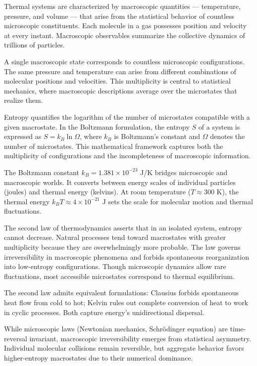 Thermal systems are characterized by macroscopic quantities — temperature, pressure, and volume — that arise from the statistical behavior of countless microscopic constituents. Each molecule in a gas possesses position and velocity at every instant. Macroscopic observables summarize the collective dynamics of trillions of particles.

A single macroscopic state corresponds to countless microscopic configurations. The same pressure and temperature can arise from different combinations of molecular positions and velocities. This multiplicity is central to statistical mechanics, where macroscopic descriptions average over the microstates that realize them.

Entropy quantifies the logarithm of the number of microstates compatible with a given macrostate. In the Boltzmann formulation, the entropy $S$ of a system is expressed as $S = k_B \ln \Omega$, where $k_B$ is Boltzmann's constant and $\Omega$ denotes the number of microstates. This mathematical framework captures both the multiplicity of configurations and the incompleteness of macroscopic information.

The Boltzmann constant $k_B = 1.381 \times 10^{-23}$ J/K bridges microscopic and macroscopic worlds. It converts between energy scales of individual particles (joules) and thermal energy (kelvins). At room temperature ($T \approx 300$ K), the thermal energy $k_B T \approx 4 \times 10^{-21}$ J sets the scale for molecular motion and thermal fluctuations.

The second law of thermodynamics asserts that in an isolated system, entropy cannot decrease. Natural processes tend toward macrostates with greater multiplicity because they are overwhelmingly more probable. The law governs irreversibility in macroscopic phenomena and forbids spontaneous reorganization into low-entropy configurations. Though microscopic dynamics allow rare fluctuations, most accessible microstates correspond to thermal equilibrium.

The second law admits equivalent formulations: Clausius forbids spontaneous heat flow from cold to hot; Kelvin rules out complete conversion of heat to work in cyclic processes. Both capture energy's unidirectional dispersal.

While microscopic laws (Newtonian mechanics, Schrödinger equation) are time-reversal invariant, macroscopic irreversibility emerges from statistical asymmetry. Individual molecular collisions remain reversible, but aggregate behavior favors higher-entropy macrostates due to their numerical dominance.

